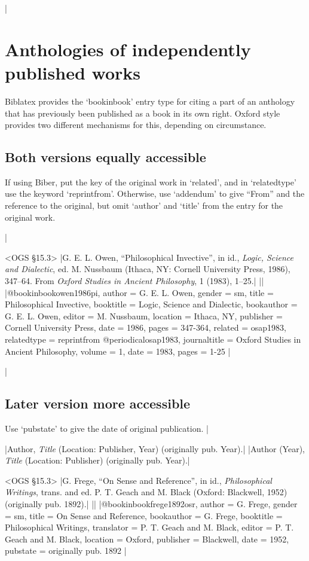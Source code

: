 \documentclass[extrafontsizes,11pt,a4paper,oneside]{memoir}
\newcommand*{\lit}[1]{\textsf{#1}}
\newcommand*{\code}[1]{`\textsf{#1}'}
\begin{document}
\todoc|
\section{Anthologies of independently published works}

Biblatex provides the \code{bookinbook} entry type for citing a part of an anthology that has previously been published as a book in its own right. Oxford style provides two different mechanisms for this, depending on circumstance.

\subsection{Both versions equally accessible}

If using Biber, put the key of the original work in \code{related}, and in \code{relatedtype} use the keyword \code{reprintfrom}. Otherwise, use \code{addendum} to give \enquote{From} and the reference to the original, but omit \code{author} and \code{title} from the entry for the original work.

|

\bibexample<OGS \S15.3>
|G. E. L. Owen, \enquote{Philosophical Invective}, in id., \emph{Logic, Science and Dialectic}, ed. M. Nussbaum (Ithaca, NY: Cornell University Press, 1986), 347--64. From \emph{Oxford Studies in Ancient Philosophy}, 1 (1983), 1--25.|%
||%
|@bookinbook{owen1986pi,
  author = {G. E. L. Owen},
  gender = {sm},
  title = {Philosophical Invective},
  booktitle = {Logic, Science and Dialectic},
  bookauthor = {G. E. L. Owen},
  editor = {M. Nussbaum},
  location = {Ithaca, NY},
  publisher = {Cornell University Press},
  date = {1986},
  pages = {347-364},
  related = {osap1983},
  relatedtype = {reprintfrom}
}
@periodical{osap1983,
  journaltitle = {Oxford Studies in Ancient Philosophy},
  volume = {1},
  date = {1983},
  pages = {1-25}
}|

\todoc|
\subsection{Later version more accessible}

Use \code{pubstate} to give the date of original publication.
|

\specs
|Author, \emph{Title} (Location: Publisher, Year) (\lit{originally pub.} Year).|%
|Author (Year), \emph{Title} (Location: Publisher) (\lit{originally pub.} Year).|

\bibexample<OGS \S15.3>
|G. Frege, \enquote{On Sense and Reference}, in id., \emph{Philosophical Writings}, trans. and ed. P. T. Geach and M. Black (Oxford: Blackwell, 1952) (originally pub. 1892).|%
||%
|@bookinbook{frege1892osr,
  author = {G. Frege},
  gender = {sm},
  title = {On Sense and Reference},
  bookauthor = {G. Frege},
  booktitle = {Philosophical Writings},
  translator = {P. T. Geach and M. Black},
  editor = {P. T. Geach and M. Black},
  location = {Oxford},
  publisher = {Blackwell},
  date = {1952},
  pubstate = {originally pub\adddotspace 1892}
}|
\end{document}
